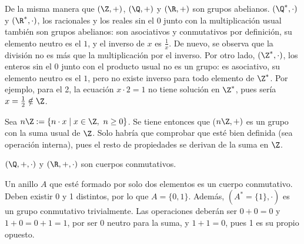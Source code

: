 \begin{TFGampliado}
    \begin{ejs}
     \item De la misma manera que $(\Z,+)$, $(\Q,+)$ y $(\R,+)$ son grupos abelianos. $(\Q^*,\cdot)$ y $(\R^*,\cdot)$, los racionales y los reales sin el $0$ junto con la multiplicación usual también son grupos abelianos: son asociativos y conmutativos por definición, su elemento neutro es el $1$, y el inverso de $x$ es $\frac{1}{x}$. De nuevo, se observa que la división no es más que la multiplicación por el inverso. Por otro lado, $(\Z^*,\cdot)$, los enteros sin el 0 junto con el producto usual no es un grupo: es asociativo, su elemento neutro es el $1$, pero no existe inverso para todo elemento de $\Z^*$. Por ejemplo, para el 2, la ecuación $x\cdot 2 = 1$ no tiene solución en $\Z^*$, pues sería $x = \frac{1}{2}\notin \Z$.
     \item Sea $n\Z:= \{ n \cdot x\mid x\in\Z, \ n\geq 0\}$. Se tiene entonces que ($n\Z, +)$ es un grupo con la suma usual de $\Z$. Solo habría que comprobar que esté bien definida (sea operación interna), pues el resto de propiedades se derivan de la suma en $\Z$.
\end{ejs}
\end{TFGampliado}

\begin{TFGampliado}
    \begin{ejs}
        \item $(\Q,+, \cdot)$ y $(\R,+, \cdot)$ son cuerpos conmutativos.
        \item Un anillo $A$ que esté formado por solo dos elementos es un cuerpo conmutativo. Deben existir 0 y 1 distintos, por lo que $A = \{0,1\}$. Además, $(A^* = \{1\}, \cdot)$ es un grupo conmutativo trivialmente. Las operaciones deberán ser $ 0 + 0 = 0$ y $1 + 0 = 0 + 1 = 1$, por ser 0 neutro para la suma, y $1 + 1 = 0$, pues 1 es su propio opuesto.
    \end{ejs}   
\end{TFGampliado}

